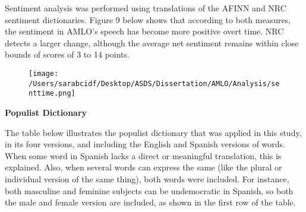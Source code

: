 \documentclass[]{article}
\begin{document}
Sentiment analysis was performed using translations of the AFINN and NRC sentiment dictionaries. Figure 9 below shows that according to both measures, the sentiment in AMLO's speech has become more positive overt time. NRC detects a larger change, although the average net sentiment remains within close bounds of scores of 3 to 14 points. 

\begin{figure}[H]
	\centering
	\caption{\label{}}
	\texttt{[image: /Users/sarabcidf/Desktop/ASDS/Dissertation/AMLO/Analysis/senttime.png]}
\end{figure}

\noindent\textbf{Populist Dictionary}
\vspace{.5cm}

The table below illustrates the populist dictionary that was applied in this study, in its four versions, and including the English and Spanish versions of words. When some word in Spanish lacks a direct or meaningful translation, this is explained. Also, when several words can express the same (like the plural or individual version of the same thing), both words were included. For instance, both masculine and feminine subjects can be undemocratic in Spanish, so both the male and female version are included, as shown in the first row of the table. 
\end{document}
